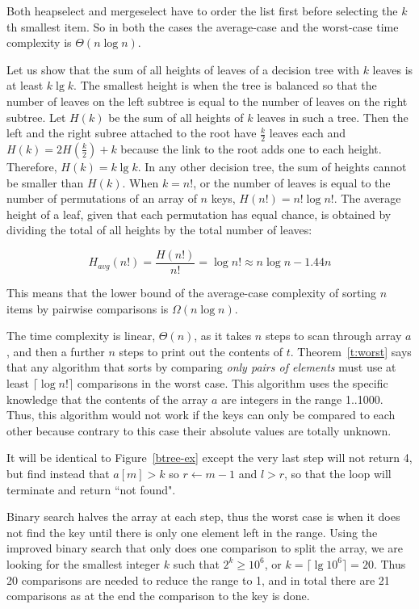 Both heapselect and mergeselect have to order the list first
before selecting the $k$th smallest item. So in both the cases
the average-case and the worst-case time complexity is $\Theta(n\log n)$.

{}%
Let us show that the sum of all heights of leaves of a decision tree with 
\(k\) leaves is at least \(k\lg{k}\). 
The smallest height is when the tree is balanced so that 
the number of leaves on the left subtree 
is equal to the number of leaves on the right subtree. 
Let \(H(k)\) 
be the sum of all heights of $k$ leaves in such a tree. Then the left
and the right subree attached to the root have $\frac{k}{2}$ leaves each and  
\(H(k) = 2H\left(\frac{k}{2}\right) + k\) because the link to the 
root adds one to each height. Therefore, $H(k) = k\lg{k}$.
In any other decision tree, the sum of heights cannot be smaller than \(H(k)\).
When \(k=n!\), or the number of leaves is equal to the number of permutations of 
an array of \(n\) keys, \(H(n!)=n!\log{n!}\). The average height 
of a leaf, given that each permutation has equal chance, is obtained by
dividing the total of all heights by the total number of leaves:

\[H_{avg}(n!) = \frac{H(n!)}{n!} = \log{n!} \approx n\log{n} - 1.44n\]

This means that the lower bound of the average-case complexity of
sorting $n$ items by pairwise comparisons is $\Omega(n\log n)$.

The time complexity is linear, $\Theta(n)$, as it takes \(n\) steps to scan through array \(a\), 
and then a further \(n\) steps to print out the contents of \(t\).
Theorem~\ref{t:worst} says that any algorithm that sorts by comparing \textit{only pairs of elements} 
must use at least \(\lceil \log{n!}\rceil\) comparisons in the worst case.
This algorithm uses the specific knowledge that the contents of 
the array \(a\) are integers in the range 1..1000. Thus, this 
algorithm would not work if the keys can only be compared to each other 
because contrary to this case their absolute values are totally unknown.

It will be identical to Figure~\ref{btree-ex} except the very last step will not 
return 4, but find instead that \(a[m] > k\) so \(r \leftarrow m-1\) and \(l > r\), 
so that the loop will terminate and return ``not found".

Binary search halves the array at each step, thus the worst case is when it does not 
find the key until there is only one element left in the range. Using the improved 
binary search that only does one comparison to split the array, we are 
looking for the smallest integer \(k\) such that \(2^k \geq 10^6\), or
$k = \lceil \lg 10^6 \rceil = 20$. 
Thus 20 comparisons are needed to reduce the range to 1, and in total 
there are 21 comparisons as at the end the comparison to the key is done. 

